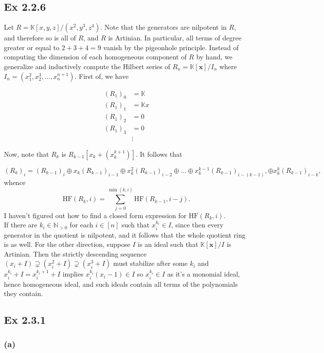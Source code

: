 \documentclass{article}
\theoremstyle{definition}
\newcommand{\K}{\mathbb{K}}
\newcommand{\N}{\mathbb{N}}
\newcommand{\Kx}{\K[\bm{x}]}
\newcommand{\HF}{\text{HF}}
\begin{document}
\subsection*{Ex 2.2.6}

Let $R = \K[x, y, z]/(x^2, y^3, z^4)$. Note that the generators are nilpotent
in $R$, and therefore so is all of $R$, and $R$ is Artinian. In particular, all
terms of degree greater or equal to $2 + 3 + 4 = 9$ vanish by the pigeonhole
principle. Instead of computing the dimension of each homogeneous component of
$R$ by hand, we generalize and inductively compute the Hilbert series of $R_n =
\Kx / I_n$ where $I_n = (x_1^{2}, x_2^{3}, \ldots, x_n^{n + 1})$. First of, we
have

\begin{align*}
	(R_1)_0 &= \K \\
	(R_1)_1 &= \K x \\
	(R_1)_2 &= 0 \\
	(R_1)_3 &= 0 \\
			&\vdots
\end{align*}

Now, note that $R_k$ is $R_{k - 1}[x_k + (x_k^{k + 1})]$. It
follows that 

\[
	(R_k)_i 
	= 
	(R_{k - 1})_i
	\oplus
	x_k (R_{k - 1})_{i - 1}
	\oplus
	x_k^2 (R_{k - 1})_{i - 2}
	\oplus
	\ldots
	\oplus
	x_k^{k - 1} (R_{k - 1})_{i - (k - 1)},
	\oplus
	x_k^{k} (R_{k - 1})_{i - k},
\] 
whence 
\[
	\HF(R_k, i)
	=
	\sum_{j = 0}^{\min(k, i)} \HF(R_{k - 1}, i - j).
\] 
I haven't figured out how to find a closed form expression for $\HF(R_k, i)$. \\

If there are $k_i \in \N_{>0}$ for each $i \in [n]$ such that $x_i^{k_i} \in
I$, since then every generator in the quotient is nilpotent, and it follows
that the whole quotient ring is as well. For the other direction, suppose $I$
is an ideal such that $\Kx/I$ is Artinian. Then the strictly descending
sequence $(x_i + I) \supsetneq (x_i^2 + I) \supsetneq (x_i^3 + I)$ must
stabilize after some $k_i$ and $x_i^{k_i} + I = x_i^{k_i + 1} + I$ implies
$x_i^{k_i}(x_i - 1) \in I$ so $x_i^{k_i} \in I$ as it's a monomial ideal, hence
homogeneous ideal, and such ideals contain all terms of the polynomials they
contain.

\subsection*{Ex 2.3.1}

\subsubsection*{(a)}
\end{document}
